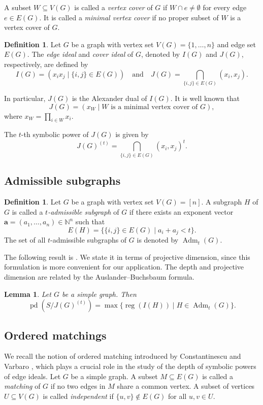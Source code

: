 \documentclass[12pt,amscd]{amsart}
\newtheorem{lem}[thm]{Lemma}
\theoremstyle{definition}
\newtheorem{defn}[thm]{Definition}
\numberwithin{equation}{section}
\DeclareMathOperator{\pd}{pd}
\DeclareMathOperator{\reg}{reg}
\def\Adm{\operatorname{Adm}}
\def\a {\mathbf a}
\begin{document}
A subset $W \subseteq V(G)$ is called a \emph{vertex cover} of $G$ if $W \cap e \neq \emptyset$ for every edge $e \in E(G)$. It is called a \emph{minimal vertex cover} if no proper subset of $W$ is a vertex cover of $G$.

\begin{defn}
Let $G$ be a graph with vertex set $V(G) = \{1, \ldots, n\}$ and edge set $E(G)$. The \emph{edge ideal} and \emph{cover ideal} of $G$, denoted by $I(G)$ and $J(G)$, respectively, are defined by
\[
I(G) = (x_ix_j \mid \{i,j\} \in E(G))
\quad \text{and} \quad
J(G) = \bigcap_{\{i,j\} \in E(G)} (x_i,x_j).
\]
\end{defn}

In particular, $J(G)$ is the Alexander dual of $I(G)$. It is well known that
\[
J(G) = (x_W \mid W \text{ is a minimal vertex cover of } G),
\]
where $x_W = \prod_{i \in W} x_i$.

The $t$-th symbolic power of $J(G)$ is given by
\[
J(G)^{(t)}
=
\bigcap_{ \{i,j\} \in E(G)}
(x_i, x_j)^t.
\]

\subsection{Admissible subgraphs}

\begin{defn}
Let $G$ be a graph with vertex set $V(G) = [n]$. A subgraph $H$ of $G$ is called a \emph{$t$-admissible subgraph} of $G$ if there exists an exponent vector $\a = (a_1, \ldots, a_n) \in \mathbb{N}^n$ such that
\[
E(H)
=
\bigl\{
\{i, j\} \in E(G)
\;\big|\;
a_i + a_j < t
\bigr\}.
\]
The set of all $t$-admissible subgraphs of $G$ is denoted by $\Adm_t(G)$.
\end{defn}

The following result is \cite[Lemma 2.11]{DHV}. We state it in terms of projective dimension, since this formulation is more convenient for our application. The depth and projective dimension are related by the Auslander--Buchsbaum formula.

\begin{lem}\label{lem_depth_admissible}
Let $G$ be a simple graph. Then
\[
\pd(S/J(G)^{(t)})
=
\max \{\reg(I(H)) \mid H \in \Adm_t(G)\}.
\]
\end{lem}

\subsection{Ordered matchings} 
We recall the notion of ordered matching introduced by Constantinescu and Varbaro \cite{CV}, which plays a crucial role in the study of the depth of symbolic powers of edge ideals. Let $G$ be a simple graph. A subset $M \subseteq E(G)$ is called a \emph{matching} of $G$ if no two edges in $M$ share a common vertex. A subset of vertices $U \subseteq V(G)$ is called \emph{independent} if
\( \{u,v\} \notin E(G)
\) for all $u,v \in U$.
\end{document}

